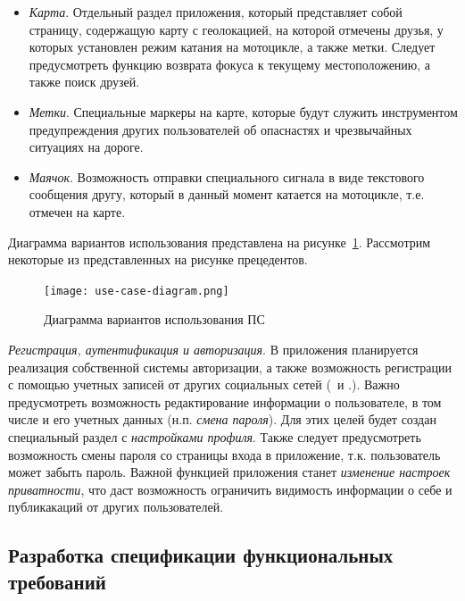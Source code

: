\begin{itemize}
	\item \emph{Карта}. Отдельный раздел приложения, который представляет собой страницу, содержащую карту с геолокацией, на которой отмечены друзья, у которых установлен режим катания на мотоцикле, а также метки. Следует предусмотреть функцию возврата фокуса к текущему местоположению, а также поиск друзей.
	\item \emph{Метки}. Специальные маркеры на карте, которые будут служить инструментом предупреждения других пользователей об опаснастях и чрезвычайных ситуациях на дороге.
	\item \emph{Маячок}. Возможность отправки специального сигнала в виде текстового сообщения другу, который в данный момент катается на мотоцикле, т.е. отмечен на карте.
\end{itemize}

Диаграмма вариантов использования представлена на рисунке~\ref{fig:domain:model:use_cases:model}.
Рассмотрим некоторые из представленных на рисунке прецедентов.

\begin{figure}[H]
\centering
	\texttt{[image: use-case-diagram.png]}
	\caption{Диаграмма вариантов использования ПС}
	\label{fig:domain:model:use_cases:model}
\end{figure}

\emph{Регистрация, аутентификация и авторизация}. В приложения планируется реализация собственной системы авторизации, а также возможность регистрации с помощью учетных записей от других социальных сетей (\facebook~и \vk.).
Важно предусмотреть возможность редактирование информации о пользователе, в том числе и его учетных данных (н.п. \emph{смена пароля}). Для этих целей будет создан специальный раздел с \emph{настройками профиля}.
Также следует предусмотреть возможность смены пароля со страницы входа в приложение, т.к. пользователь может забыть пароль.
Важной функцией приложения станет \emph{изменение настроек приватности}, что даст возможность ограничить видимость информации о себе и публикакаций от других пользователей. 

\subsection{Разработка спецификации функциональных требований}
\label{sec:domain:specification}

